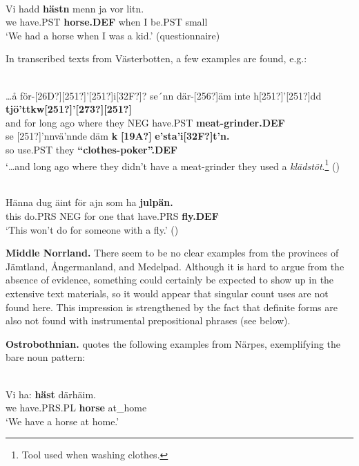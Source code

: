 \ea \label{} 
\\
\gll Vi  hadd  \textbf{hästn} menn  ja  vor  litn.\\
we  have.PST  \textbf{horse.DEF} when  I   be.PST  small\\
\glt ‘We had a horse when I was a kid.’ (questionnaire)

\z

In transcribed texts from Västerbotten, a few examples are found, e.g.:

\ea \label{} 
\\
\gll …å  för-[26D?][251?]’[251?]i[32F?]?  se´nn  där-[256?]äm  inte  h[251?]’[251?]dd  \textbf{tjö’ttkw[251?]’[273?][251?]}\\
and  for long  ago  where they  NEG  have.PST  \textbf{meat-grinder.DEF}\\
\gll se  [251?]’nnvä’nnde  däm  \textbf{k} \textbf{[19A?]} \textbf{e’sta’i[32F?]t’n.}\\
so  use.PST  they  \textbf{“clothes-poker”.DEF}\\
\glt ‘…and long ago where they didn’t have a meat-grinder they used a \textit{klädstöt}.\footnote{ Tool used when washing clothes.} (\citet[303]{Westerberg2004})

\z

\ea \label{} 
\\
\gll Hänna  dug  äint  för  ajn  som  ha  \textbf{julpän.} \\
this  do.PRS  NEG  for  one  that  have.PRS  \textbf{fly.DEF} \\
\glt ‘This won’t do for someone with a fly.’ (\citet[94]{Westerlund1978})

\z

\textbf{Middle Norrland.} There seem to be no clear examples from the provinces of Jämtland, Ångermanland, and Medelpad. Although it is hard to argue from the absence of evidence, something could certainly be expected to show up in the extensive text materials, so it would appear that singular count uses are not found here. This impression is strengthened by the fact that definite forms are also not found with instrumental prepositional phrases (see below). 

\textbf{Ostrobothnian.} \citet[207]{Nikula1997} quotes the following examples from Närpes, exemplifying the bare noun pattern:

\ea\label{}
\\
\gll Vi  ha:  \textbf{häst} därhäim.\\
we  have.PRS.PL  \textbf{horse} at\_home\\
\glt ‘We have a horse at home.’

